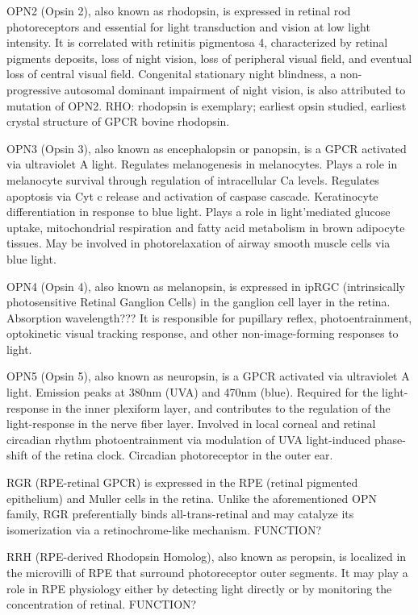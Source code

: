 \documentclass[fleqn,10pt,lineno]{manuscript}
\begin{document}
OPN2 (Opsin 2), also known as rhodopsin, is expressed in retinal rod photoreceptors and essential for light transduction and vision at low light intensity. It is correlated with retinitis pigmentosa 4, characterized by retinal pigments deposits, loss of night vision, loss of peripheral visual field, and eventual loss of central visual field. Congenital stationary night blindness, a non-progressive autosomal dominant impairment of night vision, is also attributed to mutation of OPN2. 
RHO: rhodopsin is exemplary; earliest opsin studied, earliest crystal structure of GPCR \citep{Palczeski_2000} bovine rhodopsin. 

OPN3 (Opsin 3), also known as encephalopsin or panopsin, is a GPCR activated via ultraviolet A light. 
Regulates melanogenesis in melanocytes. 
Plays a role in melanocyte survival through regulation of intracellular Ca levels. 
Regulates apoptosis via Cyt c release and activation of caspase cascade. 
Keratinocyte differentiation in response to blue light. 
Plays a role in light'mediated glucose uptake, mitochondrial respiration and fatty acid metabolism in brown adipocyte tissues. 
May be involved in photorelaxation of airway smooth muscle cells via blue light. 

OPN4 (Opsin 4), also known as melanopsin, is expressed in ipRGC (intrinsically photosensitive Retinal Ganglion Cells) in the ganglion cell layer in the retina. Absorption wavelength??? It is responsible for pupillary reflex, photoentrainment, optokinetic visual tracking response, and other non-image-forming responses to light. 

OPN5 (Opsin 5), also known as neuropsin, is a GPCR activated via ultraviolet A light. 
Emission peaks at 380nm (UVA) and 470nm (blue). 
Required for the light-response in the inner plexiform layer, and contributes to the regulation of the light-response in the nerve fiber layer. 
Involved in local corneal and retinal circadian rhythm photoentrainment via modulation of UVA light-induced phase-shift of the retina clock. 
Circadian photoreceptor in the outer ear. 

RGR (RPE-retinal GPCR) is expressed in the RPE (retinal pigmented epithelium) and Muller cells in the retina. Unlike the aforementioned OPN family, RGR preferentially binds all-trans-retinal and may catalyze its isomerization via a retinochrome-like mechanism. FUNCTION?

RRH (RPE-derived Rhodopsin Homolog), also known as peropsin, is localized in the microvilli of RPE that surround photoreceptor outer segments. It may play a role in RPE physiology either by detecting light directly or by monitoring the concentration of retinal. FUNCTION?
\end{document}
